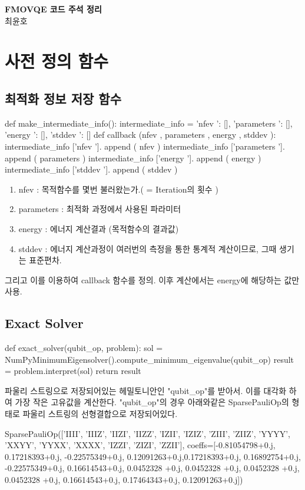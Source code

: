 \documentclass[11pt]{article}
\begin{document}
\begin{center}
  {\LARGE \bfseries FMOVQE 코드 주석 정리} \\[10pt]
  {\large 최윤호}
\end{center}

\section{사전 정의 함수}
\subsection{최적화 정보 저장 함수}
\begin{CodeBox}[title={Example: Python snippet}]
def make_intermediate_info():
    intermediate_info = {
        'nfev ': [], 
        'parameters ': [],
        'energy ': [],
        'stddev ': []
    }
def callback (nfev , parameters , energy , stddev ):
    intermediate_info ['nfev ']. append ( nfev )
    intermediate_info ['parameters ']. append ( parameters )
    intermediate_info ['energy ']. append ( energy )
    intermediate_info ['stddev ']. append ( stddev )
\end{CodeBox}

\begin{enumerate}[label=\textbf{*}, leftmargin=*]
  \item nfev : 목적함수를 몇번 불러왔는가.( = Iteration의 횟수 )
  \item parameters : 최적화 과정에서 사용된 파라미터
  \item energy : 에너지 계산결과 (목적함수의 결과값)
  \item stddev : 에너지 계산과정이 여러번의 측정을 통한 통계적 계산이므로, 그때 생기는 표준편차. 
\end{enumerate}
그리고 이를 이용하여 callback 함수를 정의. 이후 계산에서는 energy에 해당하는 값만 사용. 
\subsection{Exact Solver}
\begin{CodeBox}[title={Example: Python snippet}]
def exact_solver(qubit_op, problem):
    sol = NumPyMinimumEigensolver().compute_minimum_eigenvalue(qubit_op)
    result = problem.interpret(sol)
    return result
\end{CodeBox} 
파울리 스트링으로 저장되어있는 헤밀토니안인 "qubit\_op"를 받아서. 이를 대각화 하여 가장 작은 고유값을 계산한다. 
"qubit\_op"의 경우 아래와같은 SparsePauliOp의 형태로 파울리 스트링의 선형결합으로 저장되어있다. 
\begin{CodeBox}[title={Example: Python snippet}]
SparsePauliOp(['IIII', 'IIIZ', 'IIZI', 'IIZZ', 'IZII', 'IZIZ', 'ZIII', 'ZIIZ', 'YYYY', 'XXYY', 'YYXX', 'XXXX', 'IZZI', 'ZIZI', 'ZZII'],
coeffs=[-0.81054798+0.j,  0.17218393+0.j, -0.22575349+0.j,  0.12091263+0.j,0.17218393+0.j,  0.16892754+0.j, -0.22575349+0.j,  0.16614543+0.j, 0.0452328 +0.j,  0.0452328 +0.j,  0.0452328 +0.j,  0.0452328 +0.j, 0.16614543+0.j,  0.17464343+0.j,  0.12091263+0.j])
\end{CodeBox} 
\end{document}
